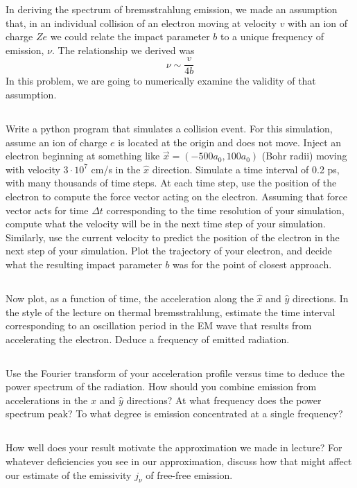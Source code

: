 \documentclass[11pt]{article}
\begin{document}
In deriving the spectrum of bremsstrahlung emission, we made an assumption that, in an
individual collision of an electron moving at velocity $v$ with an ion of charge $Ze$
we could relate the impact parameter $b$ to a unique frequency of emission, $\nu$.  The
relationship we derived was
\begin{equation}
\nu\sim\frac{v}{4b}
\end{equation}
In this problem, we are going to numerically examine the validity of that assumption.

\subsection{}

Write a python program that simulates a collision event.  For this simulation,
assume an ion of charge $e$ is located at the origin and does not move.  Inject an
electron beginning at something like $\vec x=(-500a_0,100a_0)$ (Bohr radii) moving with velocity
$3\cdot10^7$ cm/s in the $\hat x$ direction.  Simulate a time interval of 0.2 ps, with many thousands
of time steps.  At each time step, use the position of the electron to compute the force 
vector acting on the electron.  Assuming that force vector acts for time $\Delta t$ corresponding
to the time resolution of your simulation, compute what the velocity will be in the next time step of
your simulation.  Similarly, use the current velocity to predict the position of the electron in the
next step of your simulation.  Plot the trajectory of your electron, and decide what the resulting
impact parameter $b$ was for the point of closest approach.

\subsection{}

Now plot, as a function of time, the acceleration along the $\hat x$ and $\hat y$ directions.  In the style of
the lecture on thermal bremsstrahlung, estimate the time interval corresponding to an oscillation period in the
EM wave that results from accelerating the electron.  Deduce a frequency of emitted radiation.

\subsection{}
Use the Fourier transform of your acceleration profile versus time to deduce the power spectrum of the radiation.  How
should you combine emission from accelerations in the $\hat x$ and $\hat y$ directions?  At
what frequency does the power spectrum peak?  To what degree is emission concentrated at a single frequency?

\subsection{}
How well does your result motivate the approximation we made in lecture?  For whatever deficiencies you see in our approximation,
discuss how that might affect our estimate of the emissivity $j_\nu$ of free-free emission.
\end{document}

